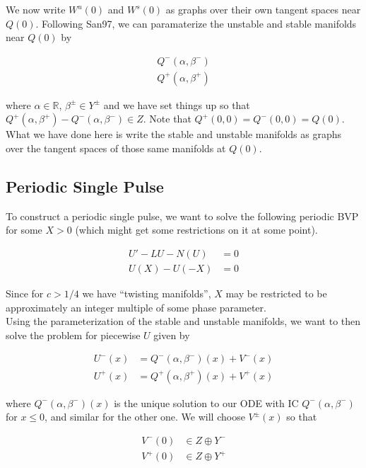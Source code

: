 \documentclass[12pt]{article}
\def\R{{\mathbb R}}
\begin{document}
We now write $W^u(0)$ and $W^s(0)$ as graphs over their own tangent spaces near $Q(0)$. Following San97, we can paramaterize the unstable and stable manifolds near $Q(0)$ by

\begin{align*}
Q^-(\alpha, \beta^-) \\
Q^+(\alpha, \beta^+)
\end{align*}

where $\alpha \in \R$, $\beta^\pm \in Y^\pm$ and we have set things up so that $Q^+(\alpha, \beta^+) - Q^-(\alpha, \beta^-) \in Z$. Note that $Q^+(0, 0) = Q^-(0, 0) = Q(0)$. What we have done here is write the stable and unstable manifolds as graphs over the tangent spaces of those same manifolds at $Q(0)$.\\

\subsection*{Periodic Single Pulse}

To construct a periodic single pulse, we want to solve the following periodic BVP for some $X > 0$ (which might get some restrictions on it at some point).

\begin{align*}
U' - LU - N(U) &= 0 \\
U(X) - U(-X) &= 0 
\end{align*}

Since for $c > 1/4$ we have ``twisting manifolds'', $X$ may be restricted to be approximately an integer multiple of some phase parameter.\\

Using the parameterization of the stable and unstable manifolds, we want to then solve the problem for piecewise $U$ given by

\begin{align*}
U^-(x) &= Q^-(\alpha, \beta^-)(x) + V^-(x) \\
U^+(x) &= Q^+(\alpha, \beta^+)(x) + V^+(x)
\end{align*}

where $Q^-(\alpha, \beta^-)(x)$ is the unique solution to our ODE with IC $Q^-(\alpha, \beta^-)$ for $x \leq 0$, and similar for the other one. We will choose $V^\pm(x)$ so that

\begin{align*}
V^-(0) &\in Z \oplus Y^- \\
V^+(0) &\in Z \oplus Y^+
\end{align*}
\end{document}
